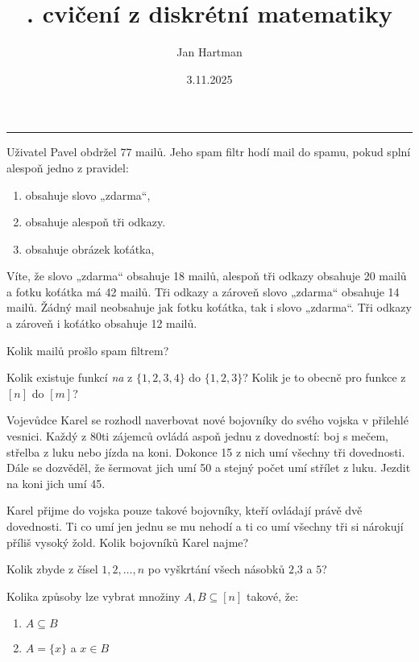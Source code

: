 \documentclass[10pt]{article}
\title{\tutnum. cvičení z diskrétní matematiky}
\author{Jan Hartman}
\date{3.11.2025}
\newcommand{\titlerule}{%
    \noindent %
    \makebox[\textwidth]{\large \thetitle \hfill \thedate}
    \rule{\textwidth}{0.4pt}%
}
\begin{document}
\titlerule

\begin{problem}
Uživatel Pavel obdržel $77$ mailů. Jeho spam filtr hodí mail do spamu, pokud splní alespoň jedno z pravidel:
\begin{enumerate}
    \item obsahuje slovo „zdarma“,
    \item obsahuje alespoň tři odkazy.
    \item obsahuje obrázek koťátka,
\end{enumerate}
Víte, že slovo „zdarma“ obsahuje 18 mailů, alespoň tři odkazy obsahuje 20 mailů a fotku koťátka má 42 mailů. Tři odkazy a zároveň slovo „zdarma“ obsahuje 14 mailů. Žádný mail neobsahuje jak fotku koťátka, tak i slovo „zdarma“. Tři odkazy a zároveň i koťátko obsahuje 12 mailů. 

\vspace{5pt}
\noindent
Kolik mailů prošlo spam filtrem?
\end{problem}

\begin{problem}
Kolik existuje funkcí \textit{na} z $\{1,2,3,4\}$ do $\{1,2,3\}$? Kolik je to obecně pro funkce z $[n]$ do $[m]$?
\end{problem}

\begin{problem}[Bojovníci]
Vojevůdce Karel se rozhodl naverbovat nové bojovníky do svého vojska v přilehlé vesnici. Každý z 80ti zájemců ovládá aspoň jednu z dovedností: boj s mečem, střelba z luku nebo jízda na koni. Dokonce 15 z nich umí všechny tři dovednosti. Dále se dozvěděl, že šermovat jich umí 50 a stejný počet umí střílet z luku. Jezdit na koni jich umí 45.

\vspace{5pt}
\noindent
Karel přijme do vojska pouze takové bojovníky, kteří ovládají právě dvě dovednosti. Ti co umí jen jednu se mu nehodí a ti co umí všechny tři si nárokují příliš vysoký žold. Kolik bojovníků Karel najme?
\end{problem}

\begin{problem}
Kolik zbyde z čísel $1,2,\ldots,n$ po vyškrtání všech násobků $2$,$3$ a $5$?
\end{problem}

\begin{problem}
Kolika způsoby lze vybrat množiny $A,B \subseteq [n]$ takové, že:
\begin{enumerate}[label=\alph*)]
    \item $A \subseteq B$
    \item $A = \{x\}$ a $x \in B$
\end{enumerate}
\end{problem}
\end{document}
